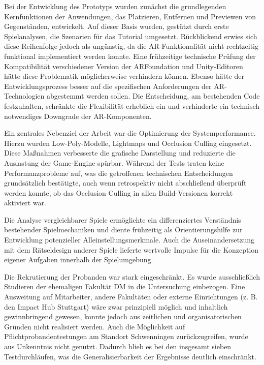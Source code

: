 Bei der Entwicklung des Prototyps wurden zunächst die grundlegenden Kernfunktionen der Anwendungen, das Platzieren, Entfernen und Previewen von Gegenständen, entwickelt. Auf dieser Basis wurden, gestützt durch erste Spielanalysen, die Szenarien für das Tutorial umgesetzt. Rückblickend erwies sich diese Reihenfolge jedoch als ungünstig, da die \ac{AR}-Funktionalität nicht rechtzeitig funktional implementiert werden konnte. Eine frühzeitige technische Prüfung der Kompatibilität verschiedener Version der ARFoundation und Unity-Editoren hätte diese Problematik möglicherweise verhindern können. Ebenso hätte der Entwicklungsprozess besser auf die spezifischen Anforderungen der \ac{AR}-Technologien abgestemmt werden sollen. Die Entscheidung, am bestehenden Code festzuhalten, schränkte die Flexibilität erheblich ein und verhinderte ein technisch notwendiges Downgrade der \ac{AR}-Komponenten. 

Ein zentrales Nebenziel der Arbeit war die Optimierung der Systemperformance. Hierzu wurden Low-Poly-Modelle, Lightmaps und Occlusion Culling eingesetzt. Diese Maßnahmen verbesserte die grafische Darstellung und reduzierte die Auslastung der Game-Engine spürbar. Während der Tests traten keine Performanzprobleme auf, was die getroffenen technischen Entscheidungen grundsätzlich bestätigte, auch wenn retrospektiv nicht abschließend überprüft werden konnte, ob das Occlusion Culling in allen Build-Versionen korrekt aktiviert war.

Die Analyse vergleichbarer Spiele ermöglichte ein differenziertes Verständnis bestehender Spielmechaniken und diente frühzeitig als Orientierungshilfe zur Entwicklung potenzieller Alleinstellungsmerkmale. Auch die Auseinandersetzung mit dem Rätseldesign anderer Spiele lieferte wertvolle Impulse für die Konzeption eigener Aufgaben innerhalb der Spielumgebung.

Die Rekrutierung der Probanden war stark eingeschränkt. Es wurde ausschließlich Studieren der ehemaligen Fakultät \ac{DM} in die Untersuchung einbezogen. Eine Ausweitung auf Mitarbeiter, andere Fakultäten oder externe Einrichtungen (z. B. den Impact Hub Stuttgart) wäre zwar prinzipiell möglich und inhaltlich gewinnbringend gewesen, konnte jedoch aus zeitlichen und organisatorischen Gründen nicht realisiert werden. Auch die Möglichkeit auf Pflichtprobandentestungen am Standort Schwenningen zurückzugreifen, wurde aus Unkenntnis nicht genutzt. Dadurch blieb es bei den insgesamt sieben Testdurchläufen, was die Generalisierbarkeit der Ergebnisse deutlich einschränkt.

